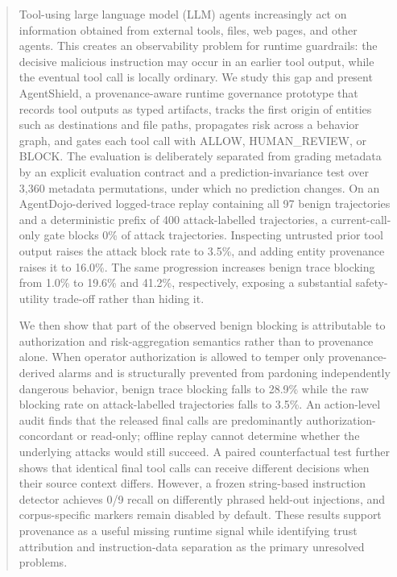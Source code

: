 \documentclass[letterpaper,twocolumn,10pt]{article}
\begin{document}
\begin{abstract}
Tool-using large language model (LLM) agents increasingly act on information
obtained from external tools, files, web pages, and other agents. This creates
an observability problem for runtime guardrails: the decisive malicious
instruction may occur in an earlier tool output, while the eventual tool call
is locally ordinary. We study this gap and present AgentShield, a
provenance-aware runtime governance prototype that records tool outputs as
typed artifacts, tracks the first origin of entities such as destinations and
file paths, propagates risk across a behavior graph, and gates each tool call
with ALLOW, HUMAN\_REVIEW, or BLOCK. The evaluation is deliberately separated
from grading metadata by an explicit evaluation contract and a
prediction-invariance test over 3,360 metadata permutations, under which no
prediction changes. On an AgentDojo-derived logged-trace replay containing all
97 benign trajectories and a deterministic prefix of 400 attack-labelled
trajectories, a current-call-only gate
blocks 0\% of attack trajectories. Inspecting untrusted prior tool output
raises the attack block rate to 3.5\%, and adding entity provenance raises it
to 16.0\%. The same progression increases benign trace blocking from 1.0\% to
19.6\% and 41.2\%, respectively, exposing a substantial safety-utility
trade-off rather than hiding it.

We then show that part of the observed benign blocking is attributable to
authorization and risk-aggregation semantics rather than to provenance alone.
When operator authorization is allowed to temper only provenance-derived
alarms and is structurally prevented from pardoning independently dangerous
behavior, benign trace blocking falls to
28.9\% while the raw blocking rate on attack-labelled trajectories falls to
3.5\%. An action-level audit finds that the released final calls are
predominantly authorization-concordant or read-only; offline replay cannot
determine whether the underlying attacks would still succeed. A paired
counterfactual test further shows that identical final tool calls can receive
different decisions when their source context differs. However, a frozen
string-based instruction detector achieves 0/9 recall on differently phrased
held-out injections, and corpus-specific markers remain disabled by default.
These results support provenance as a useful missing runtime signal while
identifying trust attribution and instruction-data separation as the primary
unresolved problems.
\end{abstract}
\end{document}
